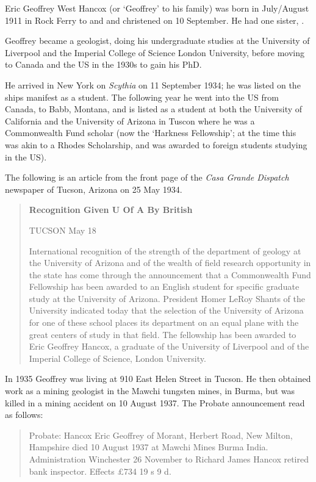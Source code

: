 
Eric Geoffrey West Hancox (or `Geoffrey' to his family) was  born in July/August 1911 in Rock Ferry\cite{EGWHbirth} to  and  and christened on 10 September.\cite{EGWHchristening} He had one sister, .

Geoffrey became a geologist, doing his undergraduate studies at the University of Liverpool and the Imperial College of Science London University, before moving to Canada and the US in the 1930s to gain his PhD.

He arrived in New York on \emph{Scythia} on 11 September 1934; he was listed on the ships manifest as a student.\cite{NYpassengers}
The following year he went into the US from Canada, to Babb, Montana, and is listed as a student at both the University of California and the University of Arizona in Tuscon\cite{USCanadaBorderCrossings} where he was a Commonwealth Fund scholar (now the `Harkness Fellowship'; at the time this was akin to a Rhodes Scholarship, and was awarded to foreign students studying in the US).

The following is an article from the front page of the \emph{Casa Grande Dispatch} newspaper of Tucson, Arizona on 25 May 1934.\cite{CasaP1}

\begin{quotation}
\textbf{Recognition Given U Of A By British}

TUCSON May 18

International recognition of the strength of the department of geology at the University of Arizona and of the wealth of field research opportunity in the state has come through the announcement that a Commonwealth Fund Fellowship has been awarded to an English student for specific graduate study at the University of Arizona. President Homer LeRoy Shants of the University indicated today that the selection of the University of Arizona for one of these school places its department on an equal plane with the great centers of study in that field. The fellowship has been awarded to Eric Geoffrey Hancox, a graduate of the University of Liverpool and of the Imperial College of Science, London University.
\end{quotation}

In 1935 Geoffrey was living at 910 East Helen Street in Tucson.\cite{USCities}
He then obtained work as a mining geologist in  the Mawchi tungsten mines, in Burma, but was killed in a mining accident on 10 August 1937.
The Probate announcement read as follows:\cite{NationalProbateCalendar}
\begin{quotation}
Probate: Hancox Eric Geoffrey of Morant, Herbert Road, New Milton, Hampshire died 10 August 1937 at Mawchi Mines Burma India. Administration Winchester 26 November to Richard James Hancox retired bank inspector. Effects \pounds734 19 s 9 d.
\end{quotation}
